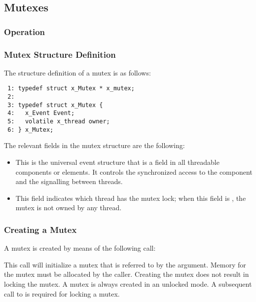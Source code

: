%
%

\subsection{Mutexes}

\subsubsection{Operation}

\subsubsection{Mutex Structure Definition}

The structure definition of a mutex is as follows:

\bcode
\begin{verbatim}
 1: typedef struct x_Mutex * x_mutex;
 2:
 3: typedef struct x_Mutex {
 4:   x_Event Event;
 5:   volatile x_thread owner;
 6: } x_Mutex;
\end{verbatim}
\ecode

The relevant fields in the mutex structure are the following:

\begin{itemize}
\item {} This is the universal event structure that is a field
in all threadable components or elements. It controls the synchronized access
to the component and the signalling between threads.
\item {} This field indicates which
thread has the mutex lock; when this field is , the
mutex is not owned by any thread.
\end{itemize}

\subsubsection{Creating a Mutex}

A mutex is created by means of the following call:


This call will initialize a mutex that is referred to by the 
argument. Memory for the mutex must be allocated by the caller. Creating the
mutex does not result in locking the mutex. A mutex is always created in an
unlocked mode. A subsequent call to  is required for
locking a mutex.

